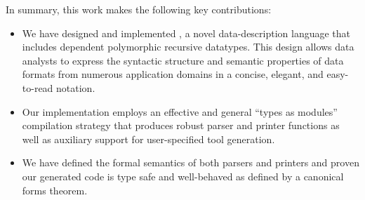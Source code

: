 

In summary, this work makes the following key contributions:
\begin{itemize}
\item We have designed and implemented \padsml{}, a novel
data-description language that includes 
dependent polymorphic recursive datatypes.  This design
allows data analysts to express the syntactic
structure and semantic properties of data formats from numerous
application domains in a concise, elegant, and easy-to-read notation.  
\item Our \padsml{} implementation employs an effective and
general ``types as modules'' compilation strategy
that produces robust parser and printer functions
as well as auxiliary support for user-specified tool generation.
\item We have defined the formal semantics of both \padsml{} parsers 
and printers and proven our generated code is type safe and
well-behaved as defined by a canonical forms theorem.
\end{itemize}

